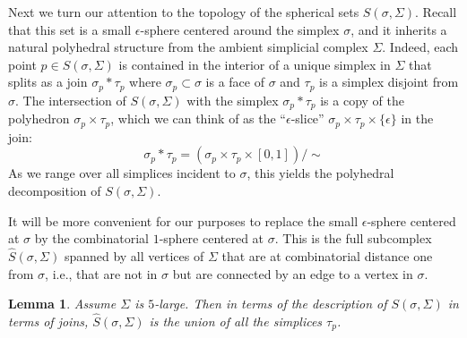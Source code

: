 \documentclass[12pt, letterpaper]{article}
\theoremstyle{plain}
\newtheorem{lem}[thm]{Lemma}
\theoremstyle{definition}
\begin{document}
Next we turn our attention to the topology of the spherical sets $S(\sigma, \Sigma)$. Recall that this set is a small $\epsilon$-sphere centered around the simplex $\sigma$, and it inherits a natural polyhedral structure from the ambient simplicial complex $\Sigma$. Indeed, each point $p\in S(\sigma, \Sigma)$ is contained in the interior of a unique simplex in $\Sigma$ that splits as a join $\sigma_p * \tau_p$ where $\sigma_p\subset \sigma$ is a face of $\sigma$ and $\tau_p$ is a simplex disjoint from $\sigma$. The intersection of $S(\sigma, \Sigma)$ with the simplex $\sigma_p * \tau_p$ is a copy of the polyhedron $\sigma_p \times \tau_p$, which we can think of as the ``$\epsilon$-slice'' $\sigma_p \times \tau_p \times \{\epsilon\}$
in the join:
    \[ \sigma_p * \tau_p = (\sigma_p \times \tau_p \times [0,1])/\sim \]
As we range over all simplices incident to $\sigma$, this yields the polyhedral decomposition of $S(\sigma, \Sigma)$. 

It will be more convenient for our purposes to replace the small $\epsilon$-sphere centered at $\sigma$ by the combinatorial $1$-sphere centered at $\sigma$. This is the full subcomplex $\hat S(\sigma, \Sigma)$ spanned by all vertices of $\Sigma$ that are at combinatorial distance one from $\sigma$, i.e., that are not in $\sigma$ but are connected by an edge to a vertex in $\sigma$.

\begin{lem}\label{lem:describe-combinatorial-sphere}
    Assume $\Sigma$ is $5$-large. Then in terms of the description of $S(\sigma, \Sigma)$ in terms of joins, $\hat S(\sigma, \Sigma)$ is the union of all the simplices $\tau_p$. 
\end{lem}
\end{document}
